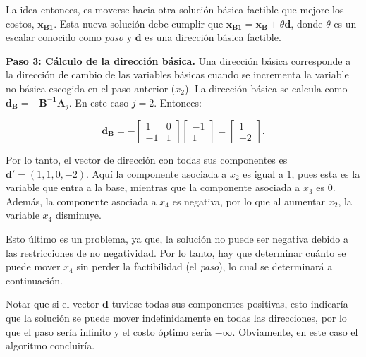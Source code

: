 \begin{enumerate}
    La idea entonces, es moverse hacia otra solución básica factible que mejore los costos, $\mathbf{x_{B1}}$. Esta nueva solución debe cumplir que $\mathbf{x_{B1}} = \mathbf{x_B} + \theta\mathbf{d}$, donde $\theta$ es un escalar conocido como \textit{paso} y $\mathbf{d}$ es una dirección básica factible.

    

    \noindent\textbf{Paso 3: Cálculo de la dirección básica.}
    Una dirección básica corresponde a la dirección de cambio de las variables básicas cuando se incrementa la variable no básica escogida en el paso anterior ($x_2$). La dirección básica se calcula como $\mathbf{d_B} = \mathbf{-B^{-1}A}_j$. En este caso $j=2$. Entonces:
    
    \begin{equation}
        \mathbf{d}_{\mathbf{B}}
        =
        -
        \begin{bmatrix}
            1 & 0 \\
            -1 & 1
        \end{bmatrix}
        \begin{bmatrix}
            -1 \\
            1
        \end{bmatrix}
        =
        \begin{bmatrix}
            1 \\
            -2
        \end{bmatrix}.
    \end{equation}

    Por lo tanto, el vector de dirección con todas sus componentes es $\mathbf{d}' = (1,1,0,-2)$. Aquí la componente asociada a $x_2$ es igual a $1$, pues esta es la variable que entra a la base, mientras que la componente asociada a $x_3$ es $0$. Además, la componente asociada a $x_4$ es negativa, por lo que al aumentar $x_2$, la variable $x_4$ disminuye.

    Esto último es un problema, ya que, la solución no puede ser negativa debido a las restricciones de no negatividad. Por lo tanto, hay que determinar cuánto se puede mover $x_4$ sin perder la factibilidad (el \textit{paso}), lo cual se determinará a continuación. 
    
    Notar que si el vector $\mathbf{d}$ tuviese todas sus componentes positivas, esto indicaría que la solución se puede mover indefinidamente en todas las direcciones, por lo que el paso sería infinito y el costo óptimo sería $-\infty$. Obviamente, en este caso el algoritmo concluiría.



\end{enumerate}
